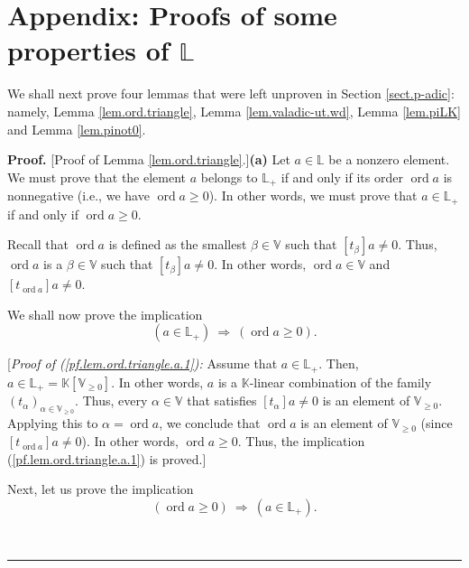 \documentclass[numbers=enddot,12pt,final,onecolumn,notitlepage]{scrartcl}%
\theoremstyle{definition}
\newenvironment{proof}[1][Proof]{\noindent\textbf{#1.} }{\ \rule{0.5em}{0.5em}}
\renewcommand{\geq}{\geqslant}
\theoremstyle{plainsl}
\begin{document}
\section{\label{sect.ord-proofs}Appendix: Proofs of some properties of
$\mathbb{L}$}

We shall next prove four lemmas that were left unproven in Section
\ref{sect.p-adic}: namely, Lemma \ref{lem.ord.triangle}, Lemma
\ref{lem.valadic-ut.wd}, Lemma \ref{lem.piLK} and Lemma \ref{lem.pinot0}.

\begin{proof}
[Proof of Lemma \ref{lem.ord.triangle}.]\textbf{(a)} Let $a\in\mathbb{L}$ be a
nonzero element. We must prove that the element $a$ belongs to $\mathbb{L}%
_{+}$ if and only if its order $\operatorname*{ord}a$ is nonnegative (i.e., we
have $\operatorname*{ord}a\geq0$). In other words, we must prove that
$a\in\mathbb{L}_{+}$ if and only if $\operatorname*{ord}a\geq0$.

Recall that $\operatorname*{ord}a$ is defined as the smallest $\beta
\in\mathbb{V}$ such that $\left[  t_{\beta}\right]  a\neq0$. Thus,
$\operatorname*{ord}a$ is a $\beta\in\mathbb{V}$ such that $\left[  t_{\beta
}\right]  a\neq0$. In other words, $\operatorname*{ord}a\in\mathbb{V}$ and
$\left[  t_{\operatorname*{ord}a}\right]  a\neq0$.

We shall now prove the implication%
\begin{equation}
\left(  a\in\mathbb{L}_{+}\right)  \ \Longrightarrow\ \left(
\operatorname*{ord}a\geq0\right)  . \label{pf.lem.ord.triangle.a.1}%
\end{equation}


[\textit{Proof of (\ref{pf.lem.ord.triangle.a.1}):} Assume that $a\in
\mathbb{L}_{+}$. Then, $a\in\mathbb{L}_{+}=\mathbb{K}\left[  \mathbb{V}%
_{\geq0}\right]  $. In other words, $a$ is a $\mathbb{K}$-linear combination
of the family $\left(  t_{\alpha}\right)  _{\alpha\in\mathbb{V}_{\geq0}}$.
Thus, every $\alpha\in\mathbb{V}$ that satisfies $\left[  t_{\alpha}\right]
a\neq0$ is an element of $\mathbb{V}_{\geq0}$. Applying this to $\alpha
=\operatorname*{ord}a$, we conclude that $\operatorname*{ord}a$ is an element
of $\mathbb{V}_{\geq0}$ (since $\left[  t_{\operatorname*{ord}a}\right]
a\neq0$). In other words, $\operatorname*{ord}a\geq0$. Thus, the implication
(\ref{pf.lem.ord.triangle.a.1}) is proved.]

Next, let us prove the implication%
\begin{equation}
\left(  \operatorname*{ord}a\geq0\right)  \ \Longrightarrow\ \left(
a\in\mathbb{L}_{+}\right)  . \label{pf.lem.ord.triangle.a.2}%
\end{equation}



\end{proof}
\end{document}
